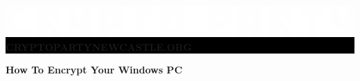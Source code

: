 \documentclass[10.5pt,a4paper]{article}
\begin{document}
\begin{center}
	\vspace{1cm}
	\colorbox{Black}{
		\begin{minipage}{18.5cm}
			\begin{center}
			\color{white}
			\vspace{0.3cm}
	             \includegraphics[width=1\textwidth]{crypto_white.eps}
	        \\[10pt]
			     \textbf{{\LARGE CRYPTOPARTYNEWCASTLE.ORG}}
			\vspace{0.3cm}
			\end{center}
		\end{minipage}
	}
\end{center}

\begin{center}
\vspace{0.5cm}
\textbf{{\LARGE How To Encrypt Your Windows PC}
\vspace{0.5cm}
}\end{center}
\end{document}
